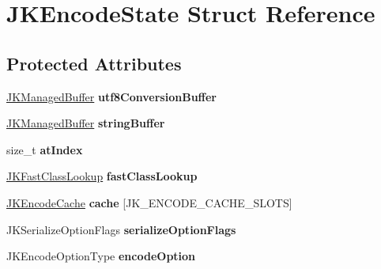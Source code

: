 \hypertarget{struct_j_k_encode_state}{\section{J\-K\-Encode\-State Struct Reference}
\label{struct_j_k_encode_state}
}
\subsection*{Protected Attributes}
\begin{DoxyCompactItemize}
\item 
\hypertarget{struct_j_k_encode_state_ad6003bab238ff8338f46d45fc4cfbcbd}{\hyperlink{struct_j_k_managed_buffer}{J\-K\-Managed\-Buffer} {\bfseries utf8\-Conversion\-Buffer}}\label{struct_j_k_encode_state_ad6003bab238ff8338f46d45fc4cfbcbd}

\item 
\hypertarget{struct_j_k_encode_state_a4bd439b08089b955e134ca9f27f3bf26}{\hyperlink{struct_j_k_managed_buffer}{J\-K\-Managed\-Buffer} {\bfseries string\-Buffer}}\label{struct_j_k_encode_state_a4bd439b08089b955e134ca9f27f3bf26}

\item 
\hypertarget{struct_j_k_encode_state_ad69c400db130e8d7b71cc8e0056e0425}{size\-\_\-t {\bfseries at\-Index}}\label{struct_j_k_encode_state_ad69c400db130e8d7b71cc8e0056e0425}

\item 
\hypertarget{struct_j_k_encode_state_a20d978369ab43265a9d2a34c318aaf33}{\hyperlink{struct_j_k_fast_class_lookup}{J\-K\-Fast\-Class\-Lookup} {\bfseries fast\-Class\-Lookup}}\label{struct_j_k_encode_state_a20d978369ab43265a9d2a34c318aaf33}

\item 
\hypertarget{struct_j_k_encode_state_a8dd15f20da4b84e02dd1c3c46e544037}{\hyperlink{struct_j_k_encode_cache}{J\-K\-Encode\-Cache} {\bfseries cache} \mbox{[}J\-K\-\_\-\-E\-N\-C\-O\-D\-E\-\_\-\-C\-A\-C\-H\-E\-\_\-\-S\-L\-O\-T\-S\mbox{]}}\label{struct_j_k_encode_state_a8dd15f20da4b84e02dd1c3c46e544037}

\item 
\hypertarget{struct_j_k_encode_state_a39ad64962cd1bc079ce8068f0d958252}{J\-K\-Serialize\-Option\-Flags {\bfseries serialize\-Option\-Flags}}\label{struct_j_k_encode_state_a39ad64962cd1bc079ce8068f0d958252}

\item 
\hypertarget{struct_j_k_encode_state_ab35dea88dca924edc5852b8e1ffd1203}{J\-K\-Encode\-Option\-Type {\bfseries encode\-Option}}\label{struct_j_k_encode_state_ab35dea88dca924edc5852b8e1ffd1203}


\end{DoxyCompactItemize}
